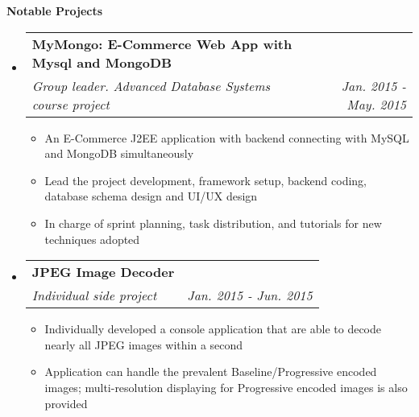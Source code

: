 \documentclass[letterpaper,10pt]{article}
\makeatletter
\newcommand{\resitem}[1]{\item #1 \vspace{-2pt}}
\newcommand{\resheading}[1]{{\large \colorbox{mygrey}{\begin{minipage}{\textwidth}{\textbf{#1 \vphantom{p\^{E}}}}\end{minipage}}}}
\newcommand{\ressubheading}[4]{
\begin{tabular*}{7.0in}{l@{\extracolsep{\fill}}r}
		\textbf{#1} & #2 \\
		\textit{#3} & \textit{#4} \\
\end{tabular*}\vspace{-6pt}}
\makeatother
\begin{document}
\resheading{Notable Projects}
\begin{itemize}
\itemsep0em
\item
	\ressubheading{MyMongo: E-Commerce Web App with Mysql and MongoDB}{}{Group leader. Advanced Database Systems course project}{Jan. 2015 - May. 2015}
	\begin{itemize}
        \resitem{An E-Commerce J2EE application with backend connecting with MySQL and MongoDB simultaneously}
        \resitem{Lead the project development, framework setup, backend coding, database schema design and UI/UX design}
        \resitem{In charge of sprint planning, task distribution, and tutorials for new techniques adopted}
	\end{itemize}
\item
	\ressubheading{JPEG Image Decoder}{}{Individual side project}{Jan. 2015 - Jun. 2015}
	\begin{itemize}
		\resitem{Individually developed a console application that are able to decode nearly all JPEG images within a second}
        \resitem{Application can handle the prevalent Baseline/Progressive encoded images; multi-resolution displaying for Progressive encoded images is also provided}
	\end{itemize}
	
\end{itemize}
\end{document}
